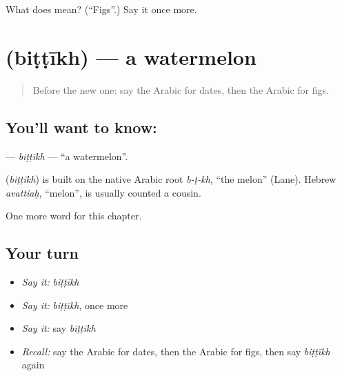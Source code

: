 \begin{tcolorbox}[breakable,colback=teal!4,colframe=teal!35!black,title={Before you move on}]
What does  mean? (\textquotedblleft{}Figs\textquotedblright{}.) Say it once more.
\end{tcolorbox}
\section[\texorpdfstring{\ar{بطيخ} (biṭṭīkh)}{بطيخ (biṭṭīkh)}]{ (biṭṭīkh) — a watermelon}

\label{lesson:AR-C130-bittikh}



\begin{quote}
Before the new one: say the Arabic for dates, then the Arabic for figs.
\end{quote}

\subsection*{You'll want to know: }
\textbf{} — \emph{biṭṭīkh} — \textquotedblleft{}a watermelon\textquotedblright{}.

\begin{cousinweb}
\textbf{} (\emph{biṭṭīkh}) is built on the native Arabic root \emph{b-ṭ-kh}, \textquotedblleft{}the melon\textquotedblright{} (Lane). Hebrew \emph{avattiaḥ}, \textquotedblleft{}melon\textquotedblright{}, is usually counted a cousin.
\end{cousinweb}

\begin{grammarlens}[title={What you've built}]
One more word for this chapter.
\end{grammarlens}

\subsection*{Your turn}
\begin{itemize}
\raggedright
  \item \emph{Say it:} \emph{biṭṭīkh}
  \item \emph{Say it:} \emph{biṭṭīkh}, once more
  \item \emph{Say it:} say \emph{biṭṭīkh}
  \item \emph{Recall:} say the Arabic for dates, then the Arabic for figs, then say \emph{biṭṭīkh} again
\end{itemize}

